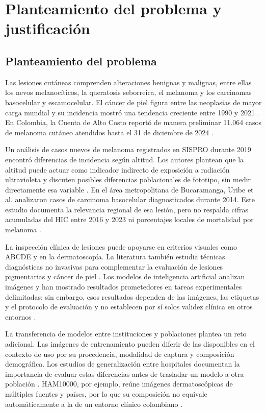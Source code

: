 \chapter{Planteamiento del problema y justificación}

\section{Planteamiento del problema}

Las lesiones cutáneas comprenden alteraciones benignas y malignas, entre ellas los nevos melanocíticos, la queratosis seborreica, el melanoma y los carcinomas basocelular y escamocelular. El cáncer de piel figura entre las neoplasias de mayor carga mundial y su incidencia mostró una tendencia creciente entre 1990 y 2021 \parencite{zhou2025skinburdengbd}. En Colombia, la Cuenta de Alto Costo reportó de manera preliminar 11.064 casos de melanoma cutáneo atendidos hasta el 31 de diciembre de 2024 \parencite{cuentaaltocosto2025melanoma}.

Un análisis de casos nuevos de melanoma registrados en SISPRO durante 2019 encontró diferencias de incidencia según altitud. Los autores plantean que la altitud puede actuar como indicador indirecto de exposición a radiación ultravioleta y discuten posibles diferencias poblacionales de fototipo, sin medir directamente esa variable \parencite{oliveros2025melanomacolombia}. En el área metropolitana de Bucaramanga, Uribe et al. analizaron casos de carcinoma basocelular diagnosticados durante 2014. Este estudio documenta la relevancia regional de esa lesión, pero no respalda cifras acumuladas del HIC entre 2016 y 2023 ni porcentajes locales de mortalidad por melanoma \parencite{uribe2018bccbucaramanga}.

La inspección clínica de lesiones puede apoyarse en criterios visuales como ABCDE y en la dermatoscopía. La literatura también estudia técnicas diagnósticas no invasivas para complementar la evaluación de lesiones pigmentarias y cáncer de piel \parencite{ligacancer2024abcde,pathania2022noninvasivediagnostics}. Los modelos de inteligencia artificial analizan imágenes y han mostrado resultados prometedores en tareas experimentales delimitadas; sin embargo, esos resultados dependen de las imágenes, las etiquetas y el protocolo de evaluación y no establecen por sí solos validez clínica en otros entornos \parencite{esteva2017dermatologist,chaturvedi2020multiclassskin}.

La transferencia de modelos entre instituciones y poblaciones plantea un reto adicional. Las imágenes de entrenamiento pueden diferir de las disponibles en el contexto de uso por su procedencia, modalidad de captura y composición demográfica. Los estudios de generalización entre hospitales documentan la importancia de evaluar estas diferencias antes de trasladar un modelo a otra población \parencite{yang2024crosshospital}. HAM10000, por ejemplo, reúne imágenes dermatoscópicas de múltiples fuentes y países, por lo que su composición no equivale automáticamente a la de un entorno clínico colombiano \parencite{tschandl2018ham10000}.

